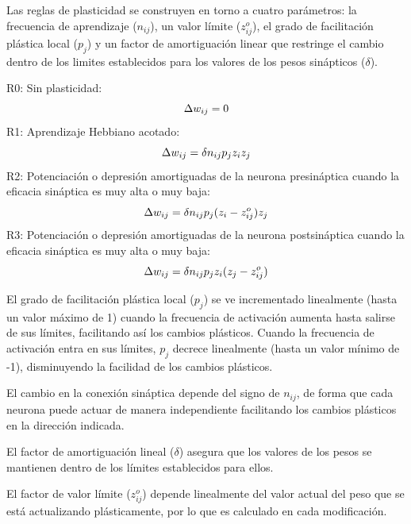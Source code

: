 Las reglas de plasticidad se construyen en torno a cuatro parámetros: la frecuencia de aprendizaje ($n_{ij}$), un valor límite ($z_{ij}^{o}$), el grado de facilitación plástica local ($p_{j}$) y
un factor de amortiguación linear que restringe el cambio dentro de los limites establecidos para los valores de los pesos sinápticos ($\delta$).

\noindent
R0: Sin plasticidad:
\begin{equation} \label{eq:R0plasticityRule}
 \centering
 \Delta w_{ij}= 0
\end{equation}
\noindent
R1: Aprendizaje Hebbiano acotado:
\begin{equation} \label{eq:R1plasticityRule}
 \centering
 \Delta w_{ij}= \delta n_{ij} p_{j} z_{i} z_{j}
\end{equation}
\noindent
R2: Potenciación o depresión amortiguadas de la neurona presináptica cuando la eficacia sináptica es muy alta o muy baja:
\begin{equation} \label{eq:R2plasticityRule}
 \centering
 \Delta w_{ij}= \delta n_{ij} p_{j} (z_{i} - z_{ij}^{o}) z_{j}
\end{equation}
\noindent
R3: Potenciación o depresión amortiguadas de la neurona postsináptica cuando la eficacia sináptica es muy alta o muy baja:
\begin{equation} \label{eq:R3plasticityRule}
 \centering
 \Delta w_{ij}= \delta n_{ij} p_{j} z_{i} (z_{j} - z_{ij}^{o})
\end{equation}

El grado de facilitación plástica local ($p_{j}$) se ve incrementado linealmente (hasta un valor máximo de 1) cuando la frecuencia de activación aumenta hasta salirse de sus límites, facilitando
así los cambios plásticos. Cuando la frecuencia de activación entra en sus límites, $p_{j}$ decrece linealmente (hasta un valor mínimo de -1), disminuyendo la facilidad de los cambios plásticos.

El cambio en la conexión sináptica depende del signo de $n_{ij}$, de forma que cada neurona puede actuar de manera independiente facilitando los cambios plásticos en la dirección indicada.

El factor de amortiguación lineal ($\delta$) asegura que los valores de los pesos se mantienen dentro de los límites establecidos para ellos.

El factor de valor límite ($z_{ij}^{o}$) depende linealmente del valor actual del peso que se está actualizando plásticamente, por lo que es calculado en cada modificación.

